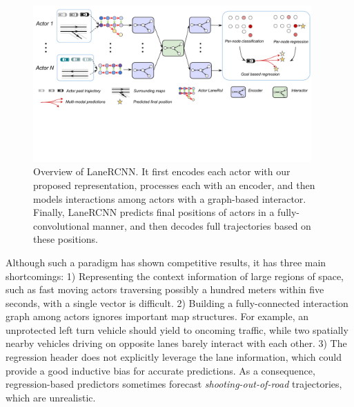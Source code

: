 \begin{figure}[t]
\begin{center}
  \includegraphics[height=6.0cm]{figures/lanercnn.pdf}
\end{center}
\vspace{-0.3cm}
\caption{Overview of LaneRCNN. It first
encodes each actor with our proposed \ROI representation, processes
each \ROI with an encoder, and then models interactions among actors with a
graph-based interactor. Finally, LaneRCNN predicts final positions of actors in
a fully-convolutional manner, and then decodes full trajectories based on these
positions.}
\vspace{-0.1cm}
\label{fig:lanercnn}
\end{figure}

Although such a paradigm has shown competitive results, it has three main shortcomings:
1) Representing the context information of large regions of space, such as fast moving actors traversing possibly a hundred meters within five seconds, with a single vector is difficult.
2) Building a fully-connected interaction graph among actors ignores important map
structures. For example, an unprotected left turn vehicle should yield to oncoming traffic, while two
spatially nearby vehicles driving on opposite lanes barely interact with each other.
3) The regression header does not explicitly leverage the lane information, which could provide a good inductive bias for accurate predictions. 
As a consequence, regression-based
predictors sometimes forecast \textit{shooting-out-of-road} trajectories, which
are unrealistic. 







